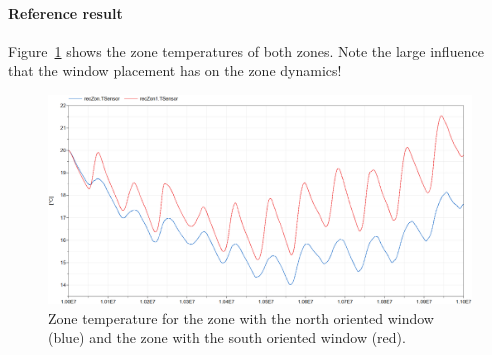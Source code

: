 \documentclass[10pt,a4paper]{article}
\begin{document}
\paragraph{Reference result}
Figure~\ref{fig:res5} shows the zone temperatures of both zones.
Note the large influence that the window placement has on the zone dynamics!

\begin{figure}[h!]
\centering
\includegraphics[scale=0.65]{Example5.png}
\caption{Zone temperature for the zone with the north oriented window (blue) and the zone with the south oriented window (red).}
\label{fig:res5}
\end{figure}
\end{document}
